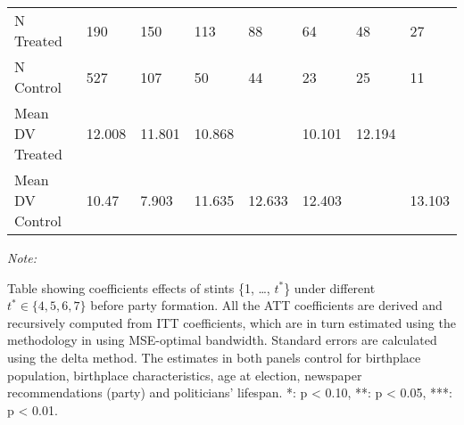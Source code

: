 \begin{table}[!h]
\begin{threeparttable}
\begin{tabular}[t]{llllllll}
\hspace{1em}N Treated & 190 & 150 & 113 & 88 & 64 & 48 & 27\\
\hspace{1em}N Control & 527 & 107 & 50 & 44 & 23 & 25 & 11\\
\hspace{1em}Mean DV Treated & 12.008 & 11.801 & 10.868 &  & 10.101 & 12.194 & \\
\hspace{1em}Mean DV Control & 10.47 & 7.903 & 11.635 & 12.633 & 12.403 &  & 13.103\\
\bottomrule
\end{tabular}
\begin{tablenotes}[para]
\item \textit{Note: } 
\item Table showing coefficients effects of stints \{1, \dots, $t^*$\} under different $t^* \in \{4,5,6,7\}$ before party formation. All the ATT coefficients are derived and recursively computed from ITT coefficients, which are in turn estimated using the methodology in \citep{cattaneo2019practical} using MSE-optimal bandwidth. Standard errors are calculated using the delta method. The estimates in both panels control for birthplace population, birthplace characteristics, age at election, newspaper recommendations (party) and politicians' lifespan. *: p < 0.10, **: p < 0.05, ***: p < 0.01. 
\end{tablenotes}
\end{threeparttable}
\end{table}
